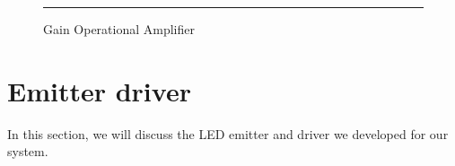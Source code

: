 \begin{figure}[htbp]
    \centering
    \rule{35em}{0.5pt}
    \caption{Gain Operational Amplifier}
    \label{fig:lpf}
\end{figure}


\section{Emitter driver}

In this section, we will discuss the LED emitter and driver we developed for our system.
 

